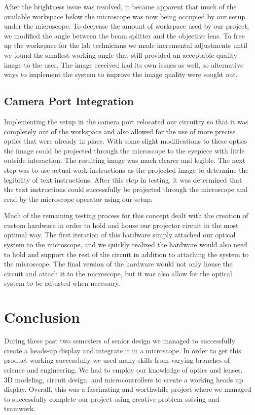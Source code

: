 \documentclass[12pt,a4paper]{article}
\begin{document}
After the brightness issue was resolved, it became apparent that much of the available workspace below the microscope was now being occupied by our setup under the microscope. To decrease the amount of workspace used by our project, we modified the angle between the beam splitter and the objective lens. To free up the workspace for the lab technicians we made incremental adjustments until we found the smallest working angle that still provided an acceptable quality image to the user. The image received had its own issues as well, so alternative ways to implement the system to improve the image quality were sought out. 

\subsection{Camera Port Integration}
Implementing the setup in the camera port relocated our circuitry so that it was completely out of the workspace and also allowed for the use of more precise optics that were already in place. With some slight modifications to these optics the image could be projected through the microscope to the eyepiece with little outside interaction. The resulting image was much clearer and legible. The next step was to use actual work instructions as the projected image to determine the legibility of text instructions. After this step in testing, it was determined that the text instructions could successfully be projected through the microscope and read by the microscope operator using our setup. 

Much of the remaining testing process for this concept dealt with the creation of custom hardware in order to hold and house our projector circuit in the most optimal way. The first iteration of this hardware simply attached our optical system to the microscope, and we quickly realized the hardware would also need to hold and support the rest of the circuit in addition to attaching the system to the microscope. The final version of the hardware would not only house the circuit and attach it to the microscope, but it was also allow for the optical system to be adjusted when necessary.

\section{Conclusion}

During these past two semesters of senior design we managed to successfully create a heads-up display and integrate it in a microscope. In order to get this product working successfully we
used many skills from varying branches of science and engineering. We had to employ our knowledge of optics and lenses, 3D modeling, circuit design, and microcontrollers to create a working heads up display. Overall, this was a fascinating and worthwhile project where we managed to successfully complete our project using creative problem solving and teamwork.
\end{document}
